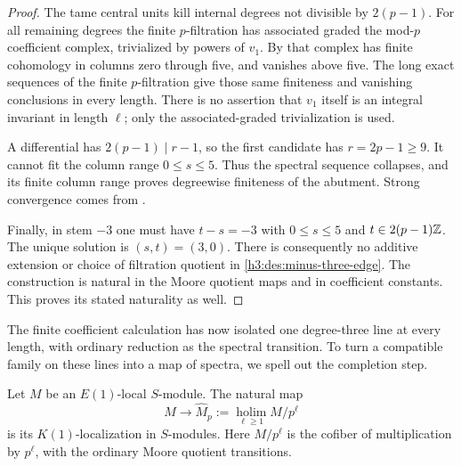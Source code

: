 \begin{proof}
The tame central units kill internal degrees
not divisible by \(2(p-1)\).
For all remaining degrees the finite \(p\)-filtration
has associated graded the mod-\(p\) coefficient
complex, trivialized by powers of \(v_1\).
By 
that complex has finite cohomology in columns
zero through five, and vanishes above five.
The long exact sequences of the finite
\(p\)-filtration give those same finiteness and
vanishing conclusions in every length.
There is no assertion that \(v_1\) itself is an
integral invariant in length \(\ell\); only the
associated-graded trivialization is used.

A differential has \(2(p-1)\mid r-1\), so the first
candidate has \(r=2p-1\geq9\).  It cannot fit the
column range \(0\leq s\leq5\).
Thus the spectral sequence collapses, and its
finite column range proves degreewise finiteness
of the abutment.  Strong convergence comes from
.

Finally, in stem \(-3\) one must have \(t-s=-3\)
with \(0\leq s\leq5\) and \(t\in2(p-1)\mathbb Z\).
The unique solution is \((s,t)=(3,0)\).
There is consequently no additive extension or
choice of filtration quotient in
\eqref{h3:des:minus-three-edge}.  The construction is
natural in the Moore quotient maps and in
coefficient constants.  This proves its stated
naturality as well.
\end{proof}

The finite coefficient calculation has now isolated one degree-three
line at every length, with ordinary reduction as the spectral
transition.  To turn a compatible family on these lines into a map of
spectra, we spell out the completion step.

\begin{lemma}\label{h3:lem:height-one-completion}
Let \(M\) be an \(E(1)\)-local \(S\)-module.  The natural map
\[
 M\longrightarrow \widehat M_p:=
       \operatorname*{holim}_{\ell\geq1} M/p^\ell
\]
is its \(K(1)\)-localization in \(S\)-modules.  Here
\(M/p^\ell\) is the cofiber of multiplication by \(p^\ell\),
with the ordinary Moore quotient transitions.
\end{lemma}

